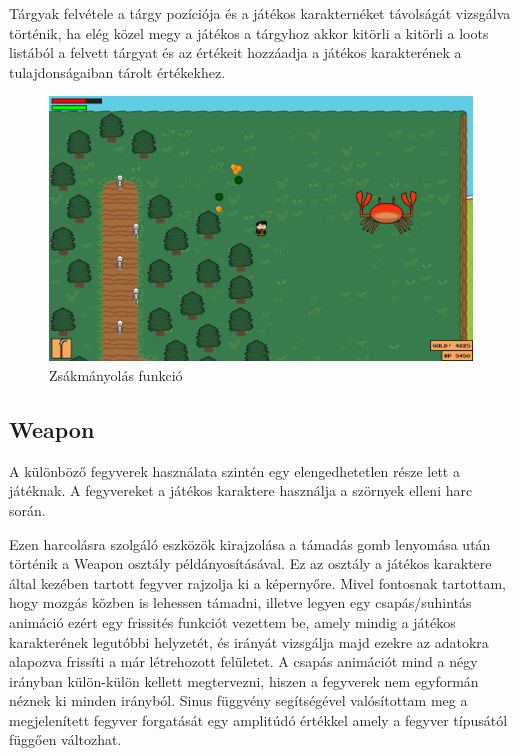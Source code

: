 Tárgyak felvétele a tárgy pozíciója és a játékos karakternéket távolságát vizsgálva történik, ha elég közel megy a játékos a tárgyhoz akkor kitörli a kitörli a loots listából a felvett tárgyat és az értékeit hozzáadja a játékos karakterének a tulajdonságaiban tárolt értékekhez.

\begin{figure}[H]
    \centering
    \includegraphics[width=15.5truecm]{images/loots.png}
    \caption{Zsákmányolás funkció}
    \label{fig:Zsákmányolás funkció}
\end{figure}


\subsection{Weapon}

A különböző fegyverek használata szintén egy elengedhetetlen része lett a játéknak. A fegyvereket a játékos karaktere használja a szörnyek elleni harc során. 

Ezen harcolásra szolgáló eszközök kirajzolása a támadás gomb lenyomása után történik a Weapon osztály példányosításával. Ez az osztály a játékos karaktere által kezében tartott fegyver rajzolja ki a képernyőre. Mivel fontosnak tartottam, hogy mozgás közben is lehessen támadni, illetve legyen egy csapás/suhintás animáció ezért egy frissités funkciót vezettem be, amely mindig a játékos karakterének legutóbbi helyzetét, és irányát vizsgálja majd ezekre az adatokra alapozva frissíti a már létrehozott felületet. A csapás animációt mind a négy irányban külön-külön kellett megtervezni, hiszen a fegyverek nem egyformán néznek ki minden irányból. Sinus függvény segítségével valósítottam meg a megjelenített fegyver forgatását egy amplitúdó értékkel amely a fegyver típusától függően változhat.


